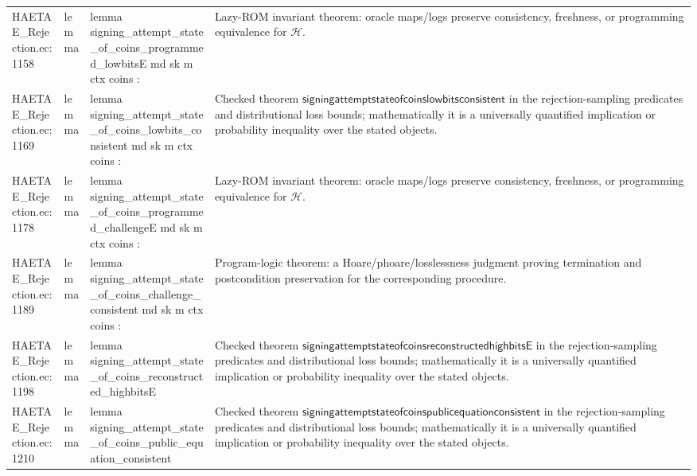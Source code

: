 \documentclass[10pt]{article}
\begin{document}
\begin{longtable}{L{0.11\textwidth}L{0.055\textwidth}L{0.385\textwidth}L{0.41\textwidth}}
HAETAE\_\allowbreak{}Rejection.\allowbreak{}ec:\allowbreak{}1158 & lemma & {\ttfamily\scriptsize lemma signing\_\allowbreak{}attempt\_\allowbreak{}state\_\allowbreak{}of\_\allowbreak{}coins\_\allowbreak{}programmed\_\allowbreak{}lowbitsE md sk m ctx coins :} & Lazy-ROM invariant theorem: oracle maps/logs preserve consistency, freshness, or programming equivalence for $\mathcal H$. \\
HAETAE\_\allowbreak{}Rejection.\allowbreak{}ec:\allowbreak{}1169 & lemma & {\ttfamily\scriptsize lemma signing\_\allowbreak{}attempt\_\allowbreak{}state\_\allowbreak{}of\_\allowbreak{}coins\_\allowbreak{}lowbits\_\allowbreak{}consistent md sk m ctx coins :} & Checked theorem $\mathsf{signingattemptstateofcoinslowbitsconsistent}$ in the rejection-sampling predicates and distributional loss bounds; mathematically it is a universally quantified implication or probability inequality over the stated objects. \\
HAETAE\_\allowbreak{}Rejection.\allowbreak{}ec:\allowbreak{}1178 & lemma & {\ttfamily\scriptsize lemma signing\_\allowbreak{}attempt\_\allowbreak{}state\_\allowbreak{}of\_\allowbreak{}coins\_\allowbreak{}programmed\_\allowbreak{}challengeE md sk m ctx coins :} & Lazy-ROM invariant theorem: oracle maps/logs preserve consistency, freshness, or programming equivalence for $\mathcal H$. \\
HAETAE\_\allowbreak{}Rejection.\allowbreak{}ec:\allowbreak{}1189 & lemma & {\ttfamily\scriptsize lemma signing\_\allowbreak{}attempt\_\allowbreak{}state\_\allowbreak{}of\_\allowbreak{}coins\_\allowbreak{}challenge\_\allowbreak{}consistent md sk m ctx coins :} & Program-logic theorem: a Hoare/phoare/losslessness judgment proving termination and postcondition preservation for the corresponding procedure. \\
HAETAE\_\allowbreak{}Rejection.\allowbreak{}ec:\allowbreak{}1198 & lemma & {\ttfamily\scriptsize lemma signing\_\allowbreak{}attempt\_\allowbreak{}state\_\allowbreak{}of\_\allowbreak{}coins\_\allowbreak{}reconstructed\_\allowbreak{}highbitsE} & Checked theorem $\mathsf{signingattemptstateofcoinsreconstructedhighbitsE}$ in the rejection-sampling predicates and distributional loss bounds; mathematically it is a universally quantified implication or probability inequality over the stated objects. \\
HAETAE\_\allowbreak{}Rejection.\allowbreak{}ec:\allowbreak{}1210 & lemma & {\ttfamily\scriptsize lemma signing\_\allowbreak{}attempt\_\allowbreak{}state\_\allowbreak{}of\_\allowbreak{}coins\_\allowbreak{}public\_\allowbreak{}equation\_\allowbreak{}consistent} & Checked theorem $\mathsf{signingattemptstateofcoinspublicequationconsistent}$ in the rejection-sampling predicates and distributional loss bounds; mathematically it is a universally quantified implication or probability inequality over the stated objects. \\

\end{longtable}
\end{document}

